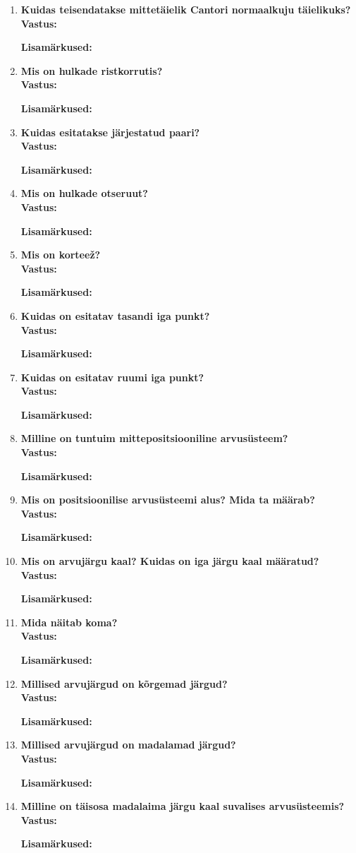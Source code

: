 \documentclass[a4paper,12pt]{article}
\makeatletter
\newenvironment{question}[1]{%
  \item \textbf{#1} \vspace{0.5em} \\ %
  \textbf{Vastus:} \vspace{0.25em} \\ %
  \def\@lisamarkused{} %
}{%
  \if\relax\detokenize\expandafter{\@lisamarkused}\relax %
  \else
    \vspace{0.5em} %
    \textbf{Lisamärkused:} \\ %
    \@lisamarkused %
  \fi
  \vspace{1em} %
}
\makeatother
\begin{document}
\begin{enumerate}[left=0pt]
\begin{question}{Kuidas teisendatakse mittetäielik Cantori normaalkuju täielikuks?}
\end{question}

\begin{question}{Mis on hulkade ristkorrutis?}
\end{question}

\begin{question}{Kuidas esitatakse järjestatud paari?}
\end{question}

\begin{question}{Mis on hulkade otseruut?}
\end{question}

\begin{question}{Mis on korteež?}
\end{question}

\begin{question}{Kuidas on esitatav tasandi iga punkt?}
\end{question}

\begin{question}{Kuidas on esitatav ruumi iga punkt?}
\end{question}

\begin{question}{Milline on tuntuim mittepositsiooniline arvusüsteem?}
\end{question}

\begin{question}{Mis on positsioonilise arvusüsteemi alus? Mida ta määrab?}
\end{question}

\begin{question}{Mis on arvujärgu kaal? Kuidas on iga järgu kaal määratud?}
\end{question}

\begin{question}{Mida näitab koma?}
\end{question}

\begin{question}{Millised arvujärgud on kõrgemad järgud?}
\end{question}

\begin{question}{Millised arvujärgud on madalamad järgud?}
\end{question}

\begin{question}{Milline on täisosa madalaima järgu kaal suvalises arvusüsteemis?}
\end{question}


\end{enumerate}
\end{document}
